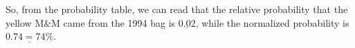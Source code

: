 \documentclass[12pt]{article}
\newcommand{\tab}{\hspace*{1.5em}}
\begin{document}
So, from the probability table, we can read that the relative probability that the yellow M\&M came from the 1994 bag is $\underline{0.02}$, while the normalized probability is $\underline{0.74=74\%}$.

\subsection*{}




\end{document}
